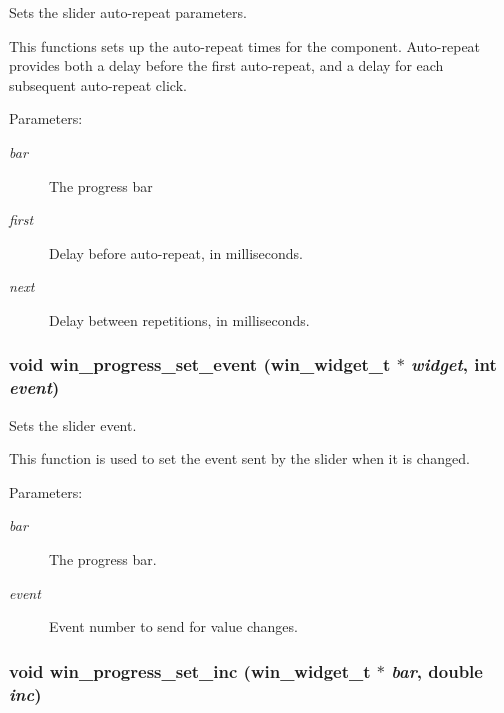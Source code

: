 Sets the slider auto-repeat parameters. 

This functions sets up the auto-repeat times for the component. Auto-repeat provides both a delay before the first auto-repeat, and a delay for each subsequent auto-repeat click.

\begin{Desc}
\item[Parameters:]
\begin{description}
\item[{\em bar}]The progress bar \item[{\em first}]Delay before auto-repeat, in milliseconds. \item[{\em next}]Delay between repetitions, in milliseconds. \end{description}
\end{Desc}
\subsubsection{\setlength{\rightskip}{0pt plus 5cm}void win\_\-progress\_\-set\_\-event ({\bf win\_\-widget\_\-t} $\ast$ {\em widget}, int {\em event})}\label{winprogress_8h_a11}


Sets the slider event. 

This function is used to set the event sent by the slider when it is changed.

\begin{Desc}
\item[Parameters:]
\begin{description}
\item[{\em bar}]The progress bar. \item[{\em event}]Event number to send for value changes. \end{description}
\end{Desc}
\subsubsection{\setlength{\rightskip}{0pt plus 5cm}void win\_\-progress\_\-set\_\-inc ({\bf win\_\-widget\_\-t} $\ast$ {\em bar}, double {\em inc})}\label{winprogress_8h_a7}


